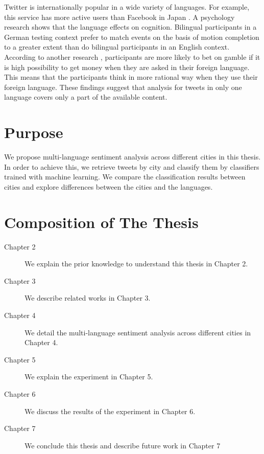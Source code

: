 Twitter is internationally popular in a wide variety of languages.
For example, this service has more active users than Facebook in Japan \cite{japan_twitter}.
A psychology research \cite{psychology1} shows that the language effects on cognition.
Bilingual participants in a German testing context prefer to match events on the basis of motion completion to a greater extent than do bilingual participants in an English context.
According to another research \cite{psychology2}, participants are more likely to bet on gamble if it is high possibility to get money when they are asked in their foreign language.
This means that the participants think in more rational way when they use their foreign language.
These findings suggest that analysis for tweets in only one language covers only a part of the available content.

\section{Purpose}
We propose multi-language sentiment analysis across different cities in this thesis.
In order to achieve this, we retrieve tweets by city and classify them by classifiers trained with machine learning. 
We compare the classification results between cities and explore differences between the cities and the languages. 

\section{Composition of The Thesis}

\begin{description}
 \item[Chapter 2] We explain the prior knowledge to understand this thesis in Chapter 2.
 \item[Chapter 3] We describe related works in Chapter 3.
 \item[Chapter 4] We detail the multi-language sentiment analysis across different cities in Chapter 4.
 \item[Chapter 5] We explain the experiment in Chapter 5.
 \item[Chapter 6] We discuss the results of the experiment in Chapter 6.
 \item[Chapter 7] We conclude this thesis and describe future work in Chapter 7
\end{description}

